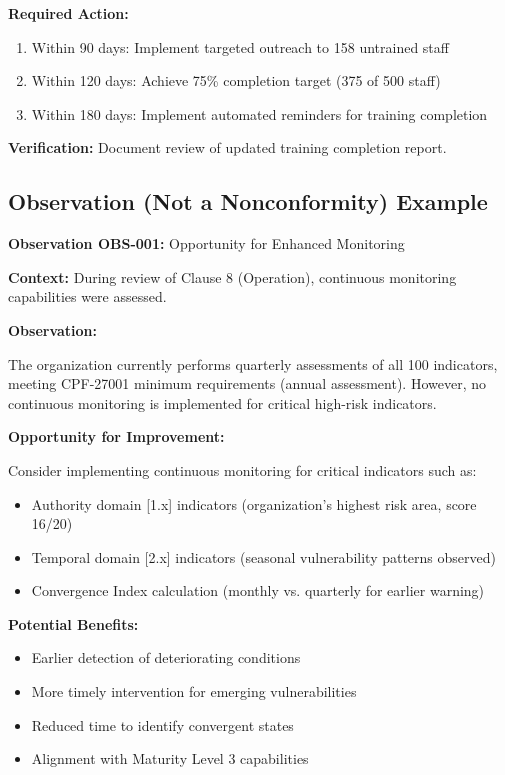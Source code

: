 \documentclass[11pt,a4paper]{article}
\begin{document}
\textbf{Required Action:}

\begin{enumerate}
\item Within 90 days: Implement targeted outreach to 158 untrained staff
\item Within 120 days: Achieve 75\% completion target (375 of 500 staff)
\item Within 180 days: Implement automated reminders for training completion
\end{enumerate}

\textbf{Verification:} Document review of updated training completion report.

\subsection{Observation (Not a Nonconformity) Example}

\textbf{Observation OBS-001:} Opportunity for Enhanced Monitoring

\textbf{Context:} During review of Clause 8 (Operation), continuous monitoring capabilities were assessed.

\textbf{Observation:}

The organization currently performs quarterly assessments of all 100 indicators, meeting CPF-27001 minimum requirements (annual assessment). However, no continuous monitoring is implemented for critical high-risk indicators.

\textbf{Opportunity for Improvement:}

Consider implementing continuous monitoring for critical indicators such as:
\begin{itemize}
\item Authority domain [1.x] indicators (organization's highest risk area, score 16/20)
\item Temporal domain [2.x] indicators (seasonal vulnerability patterns observed)
\item Convergence Index calculation (monthly vs. quarterly for earlier warning)
\end{itemize}

\textbf{Potential Benefits:}
\begin{itemize}
\item Earlier detection of deteriorating conditions
\item More timely intervention for emerging vulnerabilities
\item Reduced time to identify convergent states
\item Alignment with Maturity Level 3 capabilities
\end{itemize}
\end{document}
